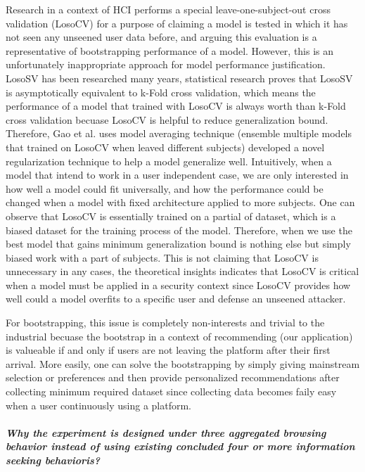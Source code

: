 Research in a context of HCI performs a special leave-one-subject-out cross validation (LosoCV)
for a purpose of claiming a model is tested in which it has not seen any unseened user data before,
and arguing this evaluation is a representative of bootstrapping performance of a model.
However, this is an unfortunately inappropriate approach for model performance justification.
LosoSV has been researched many years, statistical research proves \cite{xu2012asymptotic} 
that LosoSV is asymptotically equivalent to k-Fold cross validation, which means the performance of 
a model that trained with LosoCV is always worth than k-Fold cross validation becuase
LosoCV is helpful to reduce generalization bound. Therefore, Gao et al. uses 
model averaging technique (ensemble multiple models that trained on LosoCV when leaved different subjects) 
developed a novel regularization technique \cite{gao2016139} to help a model generalize well.
Intuitively, when a model that intend to work in a user independent case, we are only interested in
how well a model could fit universally, and how the performance could be changed when a model with fixed architecture applied
to more subjects.
One can observe that LosoCV is essentially trained on a partial of dataset, which is a biased dataset
for the training process of the model. Therefore, when we use the best model that gains minimum
generalization bound is nothing else but simply biased work with a part of subjects.
This is not claiming that LosoCV is unnecessary in any cases, the theoretical insights indicates
that LosoCV is critical when a model must be applied in a security context since 
LosoCV provides how well could a model overfits to a specific user and defense an unseened attacker.

For bootstrapping, this issue is completely non-interests and trivial to the industrial 
becuase the bootstrap in a context of recommending (our application) is valueable if and only if
users are not leaving the platform after their first arrival. More easily, one can solve
the bootstrapping by simply giving mainstream selection or preferences and then provide
personalized recommendations after collecting minimum required dataset since collecting data becomes
faily easy when a user continuously using a platform.

\paragraph{\emph{Why the experiment is designed under three aggregated browsing behavior instead of
using existing concluded four or more information seeking behavioris?}}

